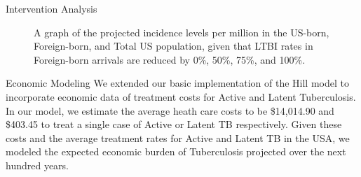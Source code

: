 \documentclass[final]{beamer}
\begin{document}
\begin{frame}
\begin{columns}
\begin{column}{.3\textwidth}
\begin{block}{Intervention Analysis}
\begin{figure}[h]
\begin{center}
          \end{center}
          \caption{A graph of the projected incidence levels per million in
                       the US-born, Foreign-born, and Total US population, given
                       that LTBI rates in Foreign-born arrivals are reduced by 
                       0\%, 50\%, 75\%, and 100\%.}
          \label{fig:redEnLTBI_incidence}
        \end{figure}
      \end{block}
      \begin{block}{Economic Modeling}
        We extended our basic implementation of the Hill model to incorporate
        economic data of treatment costs for Active and Latent Tuberculosis.  
        In our model, we estimate the average heath care costs to be \$14,014.90
        and \$403.45 to treat a single case of Active or Latent TB respectively.  
        Given these costs and the average treatment rates for Active and Latent
        TB in the USA, we modeled the expected economic burden of Tuberculosis
        projected over the next hundred years.  


\end{block}
\end{column}
\end{columns}
\end{frame}
\end{document}
